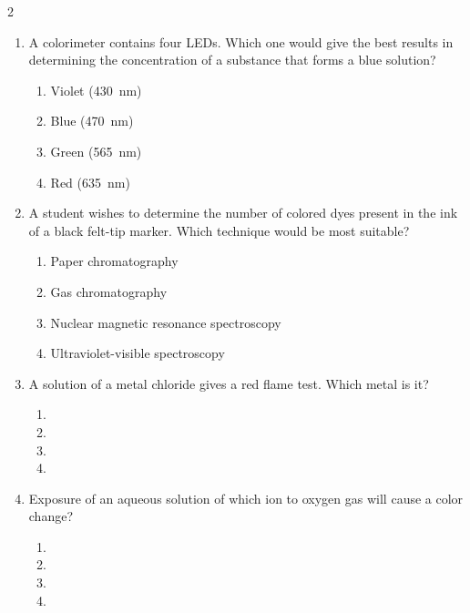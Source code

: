 \documentclass[titlepage,10pt,letterpaper]{article}
\begin{document}
\begin{multicols}{2}
\begin{enumerate}[leftmargin=*]
\item A colorimeter contains four LEDs. Which one would give the best results in determining the concentration of a substance that forms a blue solution?
\begin{enumerate}[label=(\alph*)]
    \item Violet (430~nm)
    \item Blue (470~nm)
    \item Green (565~nm)
    \item Red (635~nm)
\end{enumerate}

\item A student wishes to determine the number of colored dyes present in the ink of a black felt-tip marker. Which technique would be most suitable?
\begin{enumerate}[label=(\alph*)]
    \item Paper chromatography
    \item Gas chromatography
    \item Nuclear magnetic resonance spectroscopy
    \item Ultraviolet-visible spectroscopy
\end{enumerate}

\item A solution of a metal chloride gives a red flame test. Which metal is it?
\begin{enumerate}[label=(\alph*)]
    \item {}
    \item {}
    \item {}
    \item {}
\end{enumerate}

\item Exposure of an aqueous solution of which ion to oxygen gas will cause a color change?
\begin{enumerate}[label=(\alph*)]
    \item {}
    \item {}
    \item {}
    \item {}
\end{enumerate}


\end{enumerate}
\end{multicols}
\end{document}
